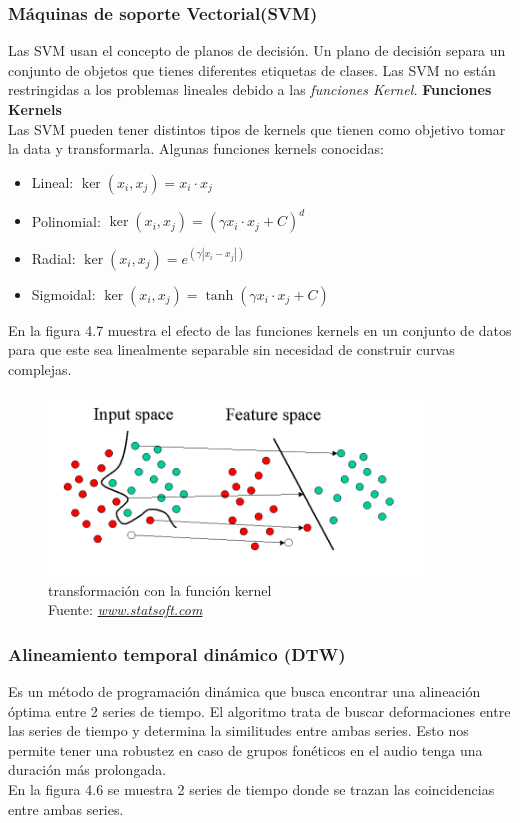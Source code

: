 \subsubsection{Máquinas de soporte Vectorial(SVM)}
Las SVM usan el concepto de planos de decisión. Un plano de decisión separa un conjunto de objetos que tienes diferentes etiquetas de clases. Las SVM no están restringidas a los problemas lineales debido a las \textit{funciones Kernel.}
\textbf{Funciones Kernels}\\
Las SVM pueden tener distintos tipos de kernels que tienen como objetivo tomar la data y transformarla. Algunas funciones kernels conocidas:
\begin{itemize}
	\item Lineal: $\ker(x_{i},x_{j})= x_{i} \cdot x_{j}$
	\item Polinomial: $\ker(x_{i},x_{j})= ( \gamma x_{i} \cdot x_{j}+C)^d$
	\item Radial: $\ker(x_{i},x_{j})= e^{(\gamma |x_{i} - x_{j}|)}$
	\item Sigmoidal: $\ker(x_{i},x_{j})= \tanh ( \gamma x_{i} \cdot x_{j}+C)$
\end{itemize}
En la figura 4.7 muestra el efecto de las funciones kernels en un conjunto de datos para que este sea linealmente separable sin necesidad de construir curvas complejas.\\
\begin{figure}[H]
	\centering
	\includegraphics[width=0.9\textwidth]{Figures/svm.png}
	\caption{transformación con la función kernel \\ Fuente:  \href{http://www.statsoft.com/Textbook/Support-Vector-Machines}{\textit{www.statsoft.com}}}
	\label{transformación con la función kernel}
\end{figure} 

\subsubsection{Alineamiento temporal dinámico (DTW)}
Es un método de programación dinámica que busca encontrar una alineación óptima entre 2 series de tiempo. El algoritmo trata de buscar deformaciones entre las series de tiempo y determina la similitudes entre ambas series. Esto nos permite tener una robustez en caso de grupos fonéticos en el audio tenga una duración más prolongada.\\ En la figura 4.6 se muestra 2 series de tiempo donde se trazan las coincidencias entre ambas series.

